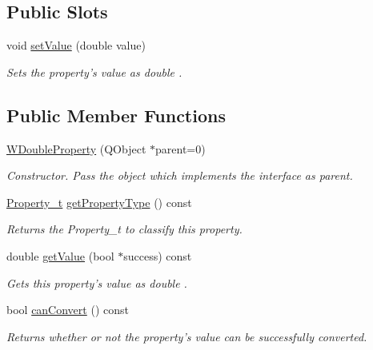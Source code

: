 \subsection*{Public Slots}
\begin{DoxyCompactItemize}
\item 
void \hyperlink{class_w_double_property_a710f9b1c3c4a12682e9fa257b832ae89}{set\-Value} (double value)
\begin{DoxyCompactList}\small\item\em Sets the property's value as double . \end{DoxyCompactList}\end{DoxyCompactItemize}
\subsection*{Public Member Functions}
\begin{DoxyCompactItemize}
\item 
\hyperlink{class_w_double_property_a7af52228cc8bbd608ef0df519f079533}{W\-Double\-Property} (Q\-Object $\ast$parent=0)
\begin{DoxyCompactList}\small\item\em Constructor. Pass the object which implements the interface as parent. \end{DoxyCompactList}\item 
\hyperlink{group___property_classes_ga38f1ccddda12c7cb50b868c9f789ee37}{Property\-\_\-t} \hyperlink{class_w_double_property_a494eec753c15d18604dc4323f2acdd91}{get\-Property\-Type} () const 
\begin{DoxyCompactList}\small\item\em Returns the Property\-\_\-t to classify this property. \end{DoxyCompactList}\item 
double \hyperlink{class_w_double_property_ac771c45522b2682056081700effc7930}{get\-Value} (bool $\ast$success) const 
\begin{DoxyCompactList}\small\item\em Gets this property's value as double . \end{DoxyCompactList}\item 
bool \hyperlink{class_w_double_property_acf72db76ced6c2dc50027bc2714be73b}{can\-Convert} () const 
\begin{DoxyCompactList}\small\item\em Returns whether or not the property's value can be successfully converted. \end{DoxyCompactList}\end{DoxyCompactItemize}
